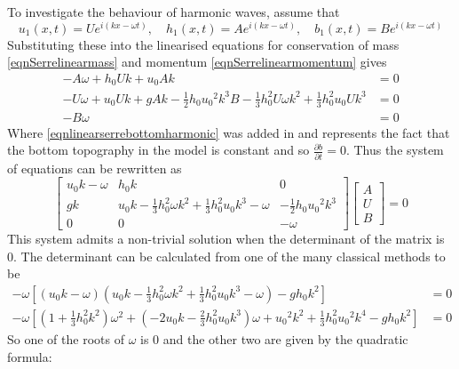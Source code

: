 \documentclass[12pt]{article}
\begin{document}
To investigate the behaviour of harmonic waves, assume that
%
\[{u_1}(x,t) = Ue^{i(kx - \omega t)} , \quad h_1(x,t) = Ae^{i(kx - \omega t)}  ,\quad b_1(x,t) = Be^{i(kx - \omega t)}\]
%
Substituting these into the linearised equations for conservation of mass \eqref{eqnSerrelinearmass} and momentum \eqref{eqnSerrelinearmomentum} gives
%
\begin{subequations}
\begin{align}
-A\omega + h_0 U k + {u_0}A k &= 0  \label{eqnlinearserremassharmonic}\\
-U\omega +  {u_0}Uk + gAk - \frac{1}{2}h_0 {u_0}^2k^3B   - \frac{1}{3}h_0^2  U\omega k^2 + \frac{1}{3}h_0^2 {u_0}  U k^3 &= 0 \label{eqnlinearserremomentumharmonic} \\
-B\omega &= 0 \label{eqnlinearserrebottomharmonic}
\end{align}
\end{subequations}
%
Where \eqref{eqnlinearserrebottomharmonic} was added in and represents the fact that the bottom topography in the model is constant and so $\frac{\partial b}{\partial t} = 0$. Thus the system of equations can be rewritten as
%
\[\left[\begin{array}{ccc}
{u_0}k - \omega & h_0k & 0 \\
gk & {u_0}k - \frac{1}{3}h_0^2\omega k^2 + \frac{1}{3}h_0^2{u_0}k^3 - \omega & - \frac{1}{2}h_0 {u_0}^2k^3 \\
0 & 0 & - \omega \end{array}\right] \left[ \begin{array}{c}
A \\
U \\
B \end{array} \right]  = 0\]
%
This system admits a non-trivial solution when the determinant of the matrix is 0. The determinant can be calculated from one of the many classical methods to be
%
\begin{align*}
-\omega \left[\left({u_0}k - \omega\right)\left({u_0}k - \frac{1}{3}h_0^2\omega k^2 + \frac{1}{3}h_0^2{u_0}k^3 - \omega\right) - g h_0 k^2\right] &= 0 \\
-\omega \left[\left(1 + \frac{1}{3}h_0^2k^2\right)\omega^2 + \left(-2{u_0}k - \frac{2}{3}h_0^2{u_0}k^3\right)\omega + {u_0}^2k^2 + \frac{1}{3}h_0^2{u_0}^2k^4 - gh_0k^2\right] &= 0
\end{align*}
%
So one of the roots of $\omega$ is 0 and the other two are given by the quadratic formula:
%
\end{document}

